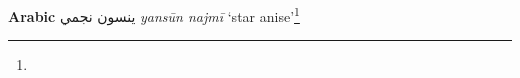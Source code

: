 \begin{etymology}\label{ety:yansun najmi}
\textbf{Arabic} {ينسون نجمي} \textit{yansūn najmī} `star anise'\footnote{}
\end{etymology}